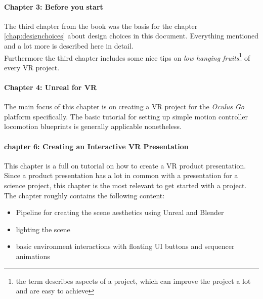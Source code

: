 \paragraph{Chapter 3: Before you start}

The third chapter from the book was the basis for the chapter \ref{chap:designchoices} about design choices in this document. Everything mentioned and a lot more is described here in detail.\\
Furthermore the third chapter includes some nice tips on \textit{low hanging fruits}\footnote{the term describes aspects of a project, which can improve the project a lot and are easy to achieve} of every VR project. 

\paragraph{Chapter 4: Unreal for VR}

The main focus of this chapter is on creating a VR project for the \textit{Oculus Go} platform specifically. The basic tutorial for setting up simple motion controller locomotion blueprints is generally applicable nonetheless.

\paragraph{chapter 6: Creating an Interactive VR Presentation}

This chapter is a full on tutorial on how to create a VR product presentation. Since a product presentation has a lot in common with a presentation for a science project, this chapter is the most relevant to get started with a project.\\
The chapter roughly contains the following content:
\begin{itemize}
\item Pipeline for creating the scene aesthetics using Unreal and Blender
\item lighting the scene
\item basic environment interactions with floating UI buttons and sequencer animations
\end{itemize}

